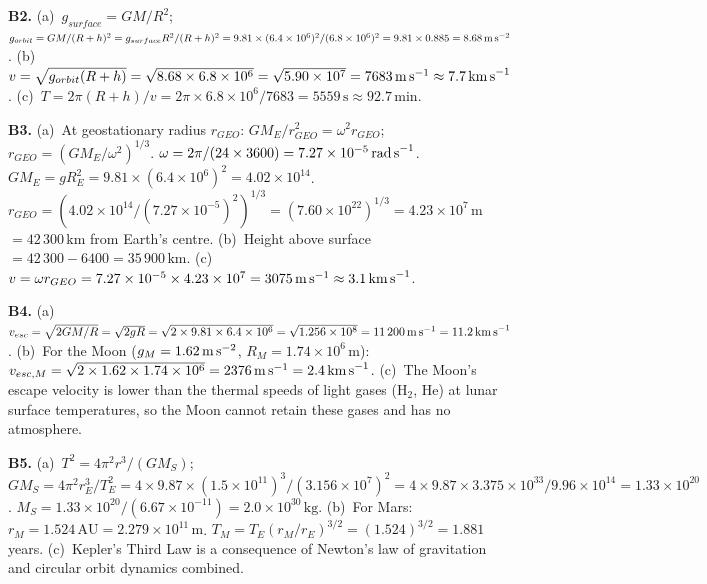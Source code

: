 \textbf{B2.}
(a)~$g_{surface}=GM/R^2$;
$g_{orbit}=GM/(R+h)^2=g_{surface}R^2/(R+h)^2
=9.81\times(6.4\times10^6)^2/(6.8\times10^6)^2
=9.81\times0.885=8.68\,\text{m\,s}^{-2}$. \quad
(b)~$v=\sqrt{g_{orbit}(R+h)}=\sqrt{8.68\times6.8\times10^6}
=\sqrt{5.90\times10^7}=7683\,\text{m\,s}^{-1}
\approx7.7\,\text{km\,s}^{-1}$. \quad
(c)~$T=2\pi(R+h)/v=2\pi\times6.8\times10^6/7683
=5559\,\text{s}\approx92.7\,\text{min}$.

\textbf{B3.}
(a)~At geostationary radius $r_{GEO}$:
$GM_E/r_{GEO}^2=\omega^2r_{GEO}$;
$r_{GEO}=(GM_E/\omega^2)^{1/3}$.
$\omega=2\pi/(24\times3600)=7.27\times10^{-5}\,\text{rad\,s}^{-1}$.
$GM_E=gR_E^2=9.81\times(6.4\times10^6)^2
=4.02\times10^{14}$.
$r_{GEO}=(4.02\times10^{14}/(7.27\times10^{-5})^2)^{1/3}
=(7.60\times10^{22})^{1/3}=4.23\times10^7\,\text{m}$
$=42\,300\,\text{km}$ from Earth's centre. \quad
(b)~Height above surface $=42\,300-6400=35\,900\,\text{km}$. \quad
(c)~$v=\omega r_{GEO}=7.27\times10^{-5}\times4.23\times10^7
=3075\,\text{m\,s}^{-1}\approx3.1\,\text{km\,s}^{-1}$.

\textbf{B4.}
(a)~$v_{esc}=\sqrt{2GM/R}=\sqrt{2gR}
=\sqrt{2\times9.81\times6.4\times10^6}
=\sqrt{1.256\times10^8}=11\,200\,\text{m\,s}^{-1}
=11.2\,\text{km\,s}^{-1}$. \quad
(b)~For the Moon ($g_M=1.62\,\text{m\,s}^{-2}$,
$R_M=1.74\times10^6\,\text{m}$):
$v_{esc,M}=\sqrt{2\times1.62\times1.74\times10^6}
=2376\,\text{m\,s}^{-1}=2.4\,\text{km\,s}^{-1}$. \quad
(c)~The Moon's escape velocity is lower than the thermal
speeds of light gases (H$_2$, He) at lunar surface
temperatures, so the Moon cannot retain these gases and
has no atmosphere.

\textbf{B5.}
(a)~$T^2=4\pi^2r^3/(GM_S)$;
$GM_S=4\pi^2r_E^3/T_E^2
=4\times9.87\times(1.5\times10^{11})^3/(3.156\times10^7)^2
=4\times9.87\times3.375\times10^{33}/9.96\times10^{14}
=1.33\times10^{20}$. \quad
$M_S=1.33\times10^{20}/(6.67\times10^{-11})
=2.0\times10^{30}\,\text{kg}$. \quad
(b)~For Mars: $r_M=1.524\,\text{AU}=2.279\times10^{11}\,\text{m}$.
$T_M=T_E(r_M/r_E)^{3/2}=(1.524)^{3/2}=1.881$ years. \quad
(c)~Kepler's Third Law is a consequence of Newton's law
of gravitation and circular orbit dynamics combined.

\endgroup


